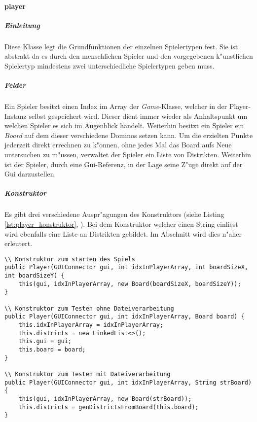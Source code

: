 \paragraph{player}
\label{par:Player}
\subparagraph{Einleitung}
Diese Klasse legt die Grundfunktionen der einzelnen Spielertypen fest. Sie ist abstrakt da es durch den menschlichen Spieler und den vorgegebenen k"unstlichen Spielertyp mindestens zwei unterschiedliche Spielertypen geben muss. 

\subparagraph{Felder}
Ein Spieler besitzt einen Index im Array der \emph{Game}-Klasse, welcher in der Player-Instanz selbst gespeichert wird. Dieser dient immer wieder als Anhaltspunkt um welchen Spieler es sich im Augenblick handelt. Weiterhin besitzt ein Spieler ein \emph{Board} auf dem dieser verschiedene Dominos setzen kann. Um die erzielten Punkte jederzeit direkt errechnen zu k"onnen, ohne jedes Mal das Board aufs Neue untersuchen zu m"ussen, verwaltet der Spieler ein Liste von Distrikten. Weiterhin ist der Spieler, durch eine Gui-Referenz, in der Lage seine Z"uge direkt auf der Gui darzustellen. 

\subparagraph{Konstruktor}
Es gibt drei verschiedene Auspr"agungen des Konstruktors (siehe Listing \ref{lst:player_konstruktor}, ). Bei dem Konstruktor welcher einen String einliest wird ebenfalls eine Liste an Distrikten gebildet. Im Abschnitt  wird dies n"aher erleutert.

\begin{lstlisting}[style=CodeHighlighting,float,caption=Player - Konstruktoren,label=lst:player_konstruktor]
\\ Konstruktor zum starten des Spiels
public Player(GUIConnector gui, int idxInPlayerArray, int boardSizeX, int boardSizeY) {
    this(gui, idxInPlayerArray, new Board(boardSizeX, boardSizeY));
}

\\ Konstruktor zum Testen ohne Dateiverarbeitung
public Player(GUIConnector gui, int idxInPlayerArray, Board board) {
    this.idxInPlayerArray = idxInPlayerArray;
    this.districts = new LinkedList<>();
    this.gui = gui;
    this.board = board;
}

\\ Konstruktor zum Testen mit Dateiverarbeitung
public Player(GUIConnector gui, int idxInPlayerArray, String strBoard) {
    this(gui, idxInPlayerArray, new Board(strBoard));
    this.districts = genDistrictsFromBoard(this.board);
}
\end{lstlisting}


